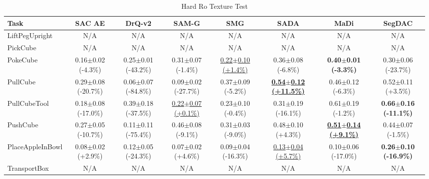 \begin{table}[htbp]
\centering
\scriptsize
\caption{Hard Ro Texture Test}
\label{tab:appendix_rotexturetest_hard}
\begin{adjustbox}{max width=\textwidth}
\begin{tabular}{l*{7}{c}}
\toprule
\textbf{Task} & \textbf{SAC AE} & \textbf{DrQ-v2} & \textbf{SAM-G} & \textbf{SMG} & \textbf{SADA} & \textbf{MaDi} & \textbf{SegDAC} \\
\midrule
LiftPegUpright & N/A & N/A & N/A & N/A & N/A & N/A & N/A \\
PickCube & N/A & N/A & N/A & N/A & N/A & N/A & N/A \\
PokeCube & 0.16$\pm$0.02 \scriptsize{(-4.3\%)} & 0.25$\pm$0.01 \scriptsize{(-43.2\%)} & 0.31$\pm$0.07 \scriptsize{(-1.4\%)} & \underline{0.22$\pm$0.10 \scriptsize{(+1.4\%)}} & 0.36$\pm$0.08 \scriptsize{(-6.8\%)} & \textbf{0.40$\pm$0.01 \scriptsize{(-3.3\%)}} & 0.30$\pm$0.06 \scriptsize{(-23.7\%)} \\
PullCube & 0.29$\pm$0.08 \scriptsize{(-20.7\%)} & 0.06$\pm$0.07 \scriptsize{(-84.8\%)} & 0.09$\pm$0.02 \scriptsize{(-27.7\%)} & 0.37$\pm$0.09 \scriptsize{(-5.2\%)} & \textbf{\underline{0.54$\pm$0.12 \scriptsize{(+11.5\%)}}} & 0.46$\pm$0.12 \scriptsize{(-6.3\%)} & 0.52$\pm$0.11 \scriptsize{(+3.5\%)} \\
PullCubeTool & 0.18$\pm$0.08 \scriptsize{(-17.0\%)} & 0.39$\pm$0.18 \scriptsize{(-37.5\%)} & \underline{0.22$\pm$0.07 \scriptsize{(+0.1\%)}} & 0.23$\pm$0.10 \scriptsize{(-0.4\%)} & 0.31$\pm$0.19 \scriptsize{(-16.1\%)} & 0.61$\pm$0.19 \scriptsize{(-1.2\%)} & \textbf{0.66$\pm$0.16 \scriptsize{(-11.1\%)}} \\
PushCube & 0.27$\pm$0.05 \scriptsize{(-10.7\%)} & 0.11$\pm$0.11 \scriptsize{(-75.4\%)} & 0.46$\pm$0.08 \scriptsize{(-9.1\%)} & 0.31$\pm$0.03 \scriptsize{(-9.0\%)} & 0.48$\pm$0.10 \scriptsize{(+4.3\%)} & \textbf{\underline{0.51$\pm$0.14 \scriptsize{(+9.1\%)}}} & 0.44$\pm$0.07 \scriptsize{(-1.5\%)} \\
PlaceAppleInBowl & 0.08$\pm$0.02 \scriptsize{(+2.9\%)} & 0.12$\pm$0.05 \scriptsize{(-24.3\%)} & 0.07$\pm$0.02 \scriptsize{(+4.6\%)} & 0.09$\pm$0.04 \scriptsize{(-16.3\%)} & \underline{0.13$\pm$0.04 \scriptsize{(+5.7\%)}} & 0.10$\pm$0.06 \scriptsize{(-17.0\%)} & \textbf{0.26$\pm$0.10 \scriptsize{(-16.9\%)}} \\
TransportBox & N/A & N/A & N/A & N/A & N/A & N/A & N/A \\
\bottomrule
\end{tabular}
\end{adjustbox}
\end{table}

